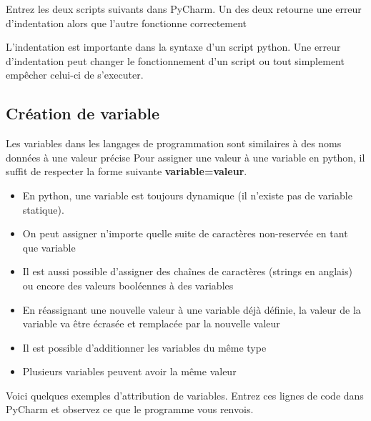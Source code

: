 \begin{conseil}
Entrez les deux scripts suivants dans PyCharm. Un des deux retourne une erreur d'indentation alors que l'autre fonctionne correctement
\end{conseil}

\begin{solution}

\end{solution}

\begin{solution}

\end{solution}

L'indentation est importante dans la syntaxe d'un script python. Une erreur d'indentation peut changer le fonctionnement d'un script ou tout simplement empêcher celui-ci de s'executer.

\subsection{Création de variable}
Les variables dans les langages de programmation sont similaires à des noms données à une valeur précise
Pour assigner une valeur à une variable en python, il suffit de respecter la forme suivante \textbf{variable=valeur}.

\begin{conseil}
\begin{itemize}
	\item En python, une variable est  toujours dynamique (il n'existe pas de variable statique).
	\item On peut assigner n'importe quelle suite de caractères non-reservée en tant que variable
	\item Il est aussi possible d'assigner des chaînes de caractères (strings en anglais) ou encore des valeurs booléennes à des variables
	\item En réassignant une nouvelle valeur à une variable déjà définie, la valeur de la variable va être écrasée et remplacée par la nouvelle valeur
	\item Il est possible d'additionner les variables du même type
	\item Plusieurs variables peuvent avoir la même valeur
\end{itemize}
\end{conseil}

Voici quelques exemples d'attribution de variables. Entrez ces lignes de code dans PyCharm et observez ce que le programme vous renvois.

\begin{solution}
    
    
\end{solution}



